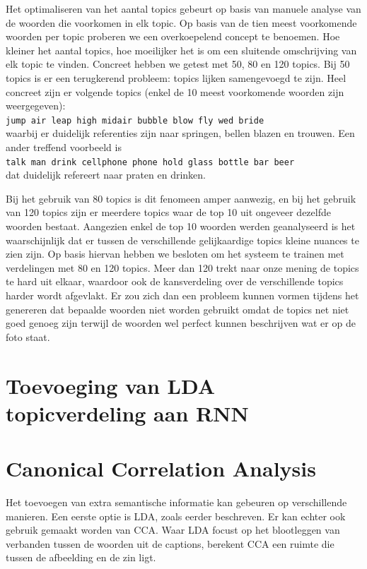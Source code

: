 Het optimaliseren van het aantal topics gebeurt op basis van manuele analyse van de woorden die voorkomen in elk topic. Op basis van de tien meest voorkomende woorden per topic proberen we een overkoepelend concept te benoemen. Hoe kleiner het aantal topics, hoe moeilijker het is om een sluitende omschrijving van elk topic te vinden. Concreet hebben we getest met 50, 80 en 120 topics. Bij 50 topics is er een terugkerend probleem: topics lijken samengevoegd te zijn. Heel concreet zijn er volgende topics (enkel de 10 meest voorkomende woorden zijn weergegeven): \\
\texttt{jump air leap high midair bubble blow fly wed bride}
\\
waarbij er duidelijk referenties zijn naar springen, bellen blazen en trouwen. Een ander treffend voorbeeld is \\
\texttt{talk man drink cellphone phone hold glass bottle bar beer}
\\ dat duidelijk refereert naar praten en drinken.

Bij het gebruik van 80 topics is dit fenomeen amper aanwezig, en bij het gebruik van 120 topics zijn er meerdere topics waar de top 10 uit ongeveer dezelfde woorden bestaat. Aangezien enkel de top 10 woorden werden geanalyseerd is het waarschijnlijk dat er tussen de verschillende gelijkaardige topics kleine nuances te zien zijn. Op basis hiervan hebben we besloten om het systeem te trainen met verdelingen met 80 en 120 topics. Meer dan 120 trekt naar onze mening de topics te hard uit elkaar, waardoor ook de kansverdeling over de verschillende topics harder wordt afgevlakt. Er zou zich dan een probleem kunnen vormen tijdens het genereren dat bepaalde woorden niet worden gebruikt omdat de topics net niet goed genoeg zijn terwijl de woorden wel perfect kunnen beschrijven wat er op de foto staat.


\section{Toevoeging van LDA topicverdeling aan RNN}

\section{Canonical Correlation Analysis}
Het toevoegen van extra semantische informatie kan gebeuren op verschillende manieren. Een eerste optie is LDA, zoals eerder beschreven. Er kan echter ook gebruik gemaakt worden van CCA. Waar LDA focust op het blootleggen van verbanden tussen de woorden uit de captions, berekent CCA een ruimte die tussen de afbeelding en de zin ligt.

